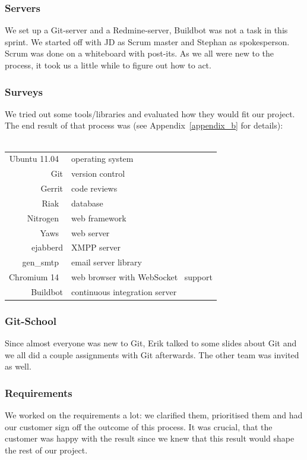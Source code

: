 \documentclass[11pt,a4paper]{report}
\begin{document}
\subsubsection{Servers}
We set up a Git-server and a Redmine-server, Buildbot was not
a task in this sprint. We started off with JD as Scrum master and Stephan as
spokesperson. Scrum was done on a whiteboard with post-its.
As we all were new to the process, it took us a little while to figure out how
to act.
\subsubsection{Surveys}
We tried out some tools/libraries and evaluated how they would fit
our project. The end result of that process was (see Appendix~\ref{appendix_b} for details): \\
\\
\begin{tabular}{r|l}
Ubuntu 11.04~\cite{ubuntu} & operating system                                   \\
Git          & version control                                    \\
Gerrit       & code reviews                                       \\
Riak~\cite{riakdb}         & database                                           \\
Nitrogen~\cite{nitrogen}     & web framework                                      \\
Yaws~\cite{yaws}         & web server                                         \\
ejabberd     & XMPP server                                        \\
gen\_smtp~\cite{gensmtp}    & email server library                               \\
Chromium 14~\cite{chromium}  & web browser with WebSocket~\cite{websocket} support \\
Buildbot     & continuous integration server
\end{tabular}
\subsubsection{Git-School}
Since almost everyone was new to Git, Erik talked to some slides about Git and
we all did a couple assignments with Git afterwards.
The other team was invited as well.
\subsubsection{Requirements}
We worked on the requirements a lot: we clarified them, prioritised them and had
our customer sign off the outcome of this process. It was crucial, that the
customer was happy with the result since we knew that this result would shape
the rest of our project.
\end{document}
